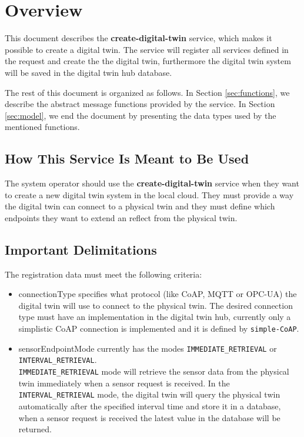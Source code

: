 \documentclass[a4paper]{arrowhead}
\begin{document}
\section{Overview}
\label{sec:overview}
This document describes the \textbf{create-digital-twin} service, which makes it possible to create a digital twin. The service will register all services defined in the request and create the the digital twin, furthermore the digital twin system will be saved in the digital twin hub database. 

The rest of this document is organized as follows.
In Section \ref{sec:functions}, we describe the abstract message functions provided by the service.
In Section \ref{sec:model}, we end the document by presenting the data types used by the mentioned functions.

\subsection{How This Service Is Meant to Be Used}
The system operator should use the \textbf{create-digital-twin} service when they want to create a new digital twin system in the local cloud. They must provide a way the digital twin can connect to a physical twin and they must define which endpoints they want to extend an reflect from the physical twin. 

\subsection{Important Delimitations}
\label{sec:delimitations}

The registration data must meet the following criteria:

\begin{itemize}
    \item connectionType specifies what protocol (like CoAP, MQTT or OPC-UA) the digital twin will use to connect to the physical twin.
    The desired connection type must have an implementation in the digital twin hub, currently only a simplistic CoAP connection is implemented and it is defined by \texttt{simple-CoAP}.

    \item sensorEndpointMode currently has the modes \texttt{IMMEDIATE\_RETRIEVAL} or \texttt{INTERVAL\_RETRIEVAL}. \\
    \texttt{IMMEDIATE\_RETRIEVAL} mode will retrieve the sensor data from the physical twin immediately when a sensor request is received. In the \texttt{INTERVAL\_RETRIEVAL} mode, the digital twin will query the physical twin automatically after the specified interval time and store it in a database, when a sensor request is received the latest value in the database will be returned. 
\end{itemize}
\end{document}
